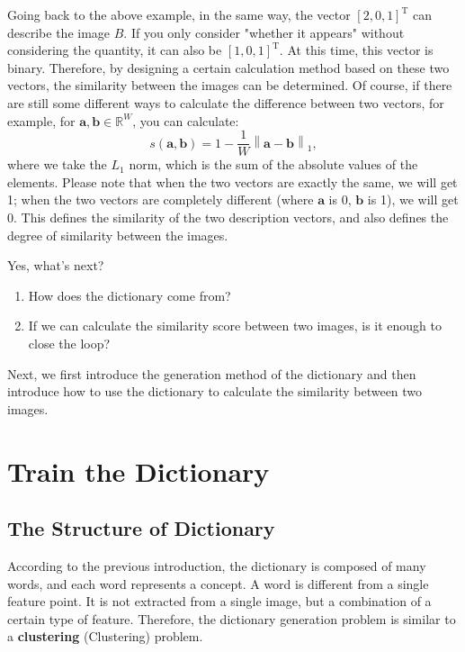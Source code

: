 Going back to the above example, in the same way, the vector $[2,0,1]^\mathrm{T}$ can describe the image $B$. If you only consider "whether it appears" without considering the quantity, it can also be $[1,0,1]^\mathrm{T}$. At this time, this vector is binary. Therefore, by designing a certain calculation method based on these two vectors, the similarity between the images can be determined. Of course, if there are still some different ways to calculate the difference between two vectors, for example, for $\mathbf{a}, \mathbf{b} \in \mathbb{R}^W$, you can calculate:
\begin{equation}
	s\left( {\mathbf{a},\mathbf{b}} \right) = 1 - \frac{1}{W}\left\| {\mathbf{a} - \mathbf{b}} \right\|_1,
\end{equation}
where we take the $L_1$ norm, which is the sum of the absolute values of the elements. Please note that when the two vectors are exactly the same, we will get 1; when the two vectors are completely different (where $\mathbf{a}$ is 0, $\mathbf{b}$ is 1), we will get 0. This defines the similarity of the two description vectors, and also defines the degree of similarity between the images.

Yes, what's next?
\begin{enumerate}
	\item How does the dictionary come from?
	\item If we can calculate the similarity score between two images, is it enough to close the loop?
\end{enumerate}

Next, we first introduce the generation method of the dictionary and then introduce how to use the dictionary to calculate the similarity between two images.

\section{Train the Dictionary}
\subsection{The Structure of Dictionary}
According to the previous introduction, the dictionary is composed of many words, and each word represents a concept. A word is different from a single feature point. It is not extracted from a single image, but a combination of a certain type of feature. Therefore, the dictionary generation problem is similar to a \textbf{clustering} (Clustering) problem.

